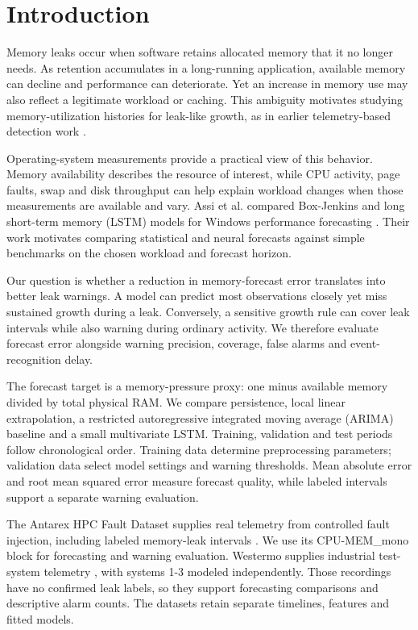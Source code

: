 \documentclass[10pt,a4paper,twocolumn]{article}
\begin{document}
\section{Introduction}

Memory leaks occur when software retains allocated memory that it no longer needs. As retention accumulates in a long-running application, available memory can decline and performance can deteriorate. Yet an increase in memory use may also reflect a legitimate workload or caching. This ambiguity motivates studying memory-utilization histories for leak-like growth, as in earlier telemetry-based detection work \cite{ref1}.

Operating-system measurements provide a practical view of this behavior. Memory availability describes the resource of interest, while CPU activity, page faults, swap and disk throughput can help explain workload changes when those measurements are available and vary. Assi et al. compared Box-Jenkins and long short-term memory (LSTM) models for Windows performance forecasting \cite{ref2}. Their work motivates comparing statistical and neural forecasts against simple benchmarks on the chosen workload and forecast horizon.

Our question is whether a reduction in memory-forecast error translates into better leak warnings. A model can predict most observations closely yet miss sustained growth during a leak. Conversely, a sensitive growth rule can cover leak intervals while also warning during ordinary activity. We therefore evaluate forecast error alongside warning precision, coverage, false alarms and event-recognition delay.

The forecast target is a memory-pressure proxy: one minus available memory divided by total physical RAM. We compare persistence, local linear extrapolation, a restricted autoregressive integrated moving average (ARIMA) baseline and a small multivariate LSTM. Training, validation and test periods follow chronological order. Training data determine preprocessing parameters; validation data select model settings and warning thresholds. Mean absolute error and root mean squared error measure forecast quality, while labeled intervals support a separate warning evaluation.

The Antarex HPC Fault Dataset supplies real telemetry from controlled fault injection, including labeled memory-leak intervals \cite{ref3,ref4,ref5}. We use its CPU-MEM\_mono block for forecasting and warning evaluation. Westermo supplies industrial test-system telemetry \cite{ref6}, with systems 1-3 modeled independently. Those recordings have no confirmed leak labels, so they support forecasting comparisons and descriptive alarm counts. The datasets retain separate timelines, features and fitted models.
\end{document}
